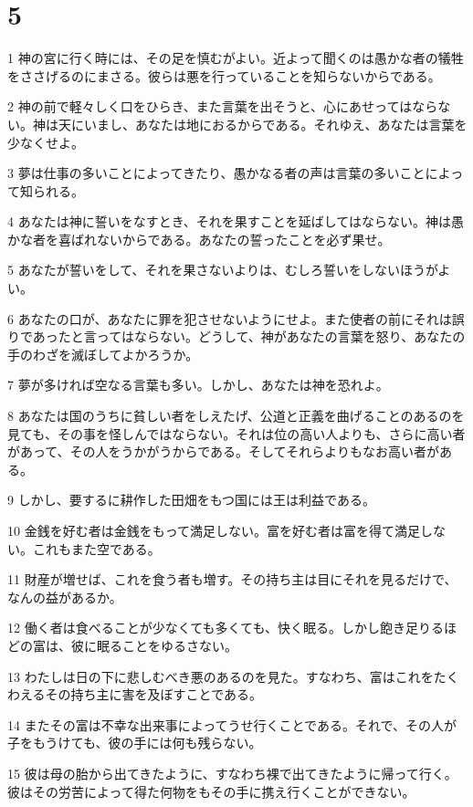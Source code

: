 \chapter{5}

\par 1 神の宮に行く時には、その足を慎むがよい。近よって聞くのは愚かな者の犠牲をささげるのにまさる。彼らは悪を行っていることを知らないからである。
\par 2 神の前で軽々しく口をひらき、また言葉を出そうと、心にあせってはならない。神は天にいまし、あなたは地におるからである。それゆえ、あなたは言葉を少なくせよ。
\par 3 夢は仕事の多いことによってきたり、愚かなる者の声は言葉の多いことによって知られる。
\par 4 あなたは神に誓いをなすとき、それを果すことを延ばしてはならない。神は愚かな者を喜ばれないからである。あなたの誓ったことを必ず果せ。
\par 5 あなたが誓いをして、それを果さないよりは、むしろ誓いをしないほうがよい。
\par 6 あなたの口が、あなたに罪を犯させないようにせよ。また使者の前にそれは誤りであったと言ってはならない。どうして、神があなたの言葉を怒り、あなたの手のわざを滅ぼしてよかろうか。
\par 7 夢が多ければ空なる言葉も多い。しかし、あなたは神を恐れよ。
\par 8 あなたは国のうちに貧しい者をしえたげ、公道と正義を曲げることのあるのを見ても、その事を怪しんではならない。それは位の高い人よりも、さらに高い者があって、その人をうかがうからである。そしてそれらよりもなお高い者がある。
\par 9 しかし、要するに耕作した田畑をもつ国には王は利益である。
\par 10 金銭を好む者は金銭をもって満足しない。富を好む者は富を得て満足しない。これもまた空である。
\par 11 財産が増せば、これを食う者も増す。その持ち主は目にそれを見るだけで、なんの益があるか。
\par 12 働く者は食べることが少なくても多くても、快く眠る。しかし飽き足りるほどの富は、彼に眠ることをゆるさない。
\par 13 わたしは日の下に悲しむべき悪のあるのを見た。すなわち、富はこれをたくわえるその持ち主に害を及ぼすことである。
\par 14 またその富は不幸な出来事によってうせ行くことである。それで、その人が子をもうけても、彼の手には何も残らない。
\par 15 彼は母の胎から出てきたように、すなわち裸で出てきたように帰って行く。彼はその労苦によって得た何物をもその手に携え行くことができない。
